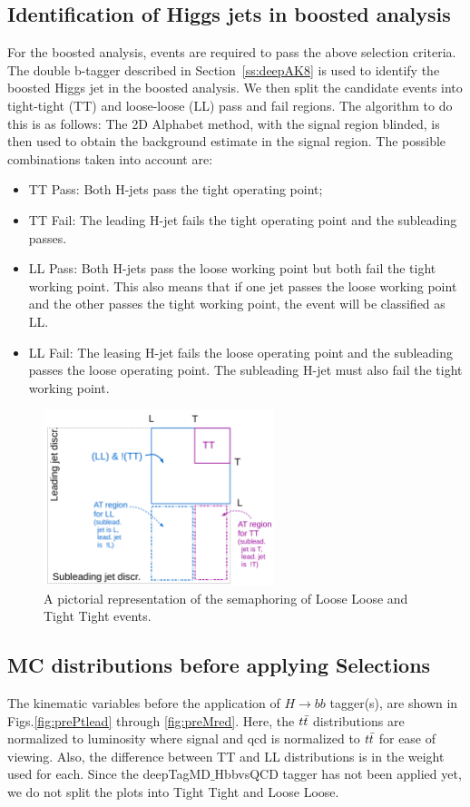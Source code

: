 \subsection{Identification of Higgs jets in boosted analysis\label{sec:EvtSelBoostedtagging}}
For the boosted analysis, events are required to pass the above selection criteria. The double b-tagger described in Section~\ref{ss:deepAK8} is used to identify the boosted Higgs jet in the boosted analysis. We then split the candidate events into tight-tight (TT) and loose-loose (LL) pass and fail regions. The algorithm to do this is as follows:
The 2D Alphabet method, with the signal region blinded, is then used to obtain the background estimate in the signal region. The possible combinations taken into account are:
\begin{itemize}
\item TT Pass: Both H-jets pass the tight operating point;
\item TT Fail: The leading H-jet fails the tight operating point and the subleading passes.
\item LL Pass: Both H-jets pass the loose working point but both fail the tight working point. This also means that if one jet passes the loose working point and the other passes the tight working point, the event will be classified as LL.
\item LL Fail: The leasing H-jet fails the loose operating point and the subleading passes the loose operating point. The subleading H-jet must also fail the tight working point.
\end{itemize}
\begin{figure}[!htb]
	\centering
	\includegraphics[width=0.6\textwidth]{Figures/splitting.png}
	\caption{A pictorial representation of the semaphoring of Loose Loose and Tight Tight events.}
	\label{fig:splitting}
\end{figure}
\clearpage

\subsection{MC distributions before applying Selections\label{ss:beforeDist}}
The kinematic variables before the application of $H \to bb$ tagger(s), are shown in Figs.\ref{fig:prePtlead} through \ref{fig:preMred}. Here, the $t\bar{t} $ distributions are normalized to luminosity where signal and qcd is normalized to $t\bar{t} $ for ease of viewing. Also, the difference between TT and LL distributions is in the weight used for each. Since the deepTagMD$\_$HbbvsQCD tagger has not been applied yet, we do not split the plots into Tight Tight and Loose Loose.


